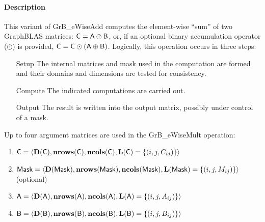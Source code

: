 \paragraph{Description}

This variant of {\sf GrB\_eWiseAdd } computes the element-wise ``sum'' of
two GraphBLAS matrices: ${\sf C} = {\sf A} \oplus {\sf B}$, or, if an optional
binary accumulation operator ($\odot$) is provided, ${\sf C} = {\sf C} \odot
\left({\sf A} \oplus {\sf B}\right)$.  Logically, this operation occurs in
three steps:
\begin{enumerate}[leftmargin=0.75in]
\item[Setup] The internal matrices and mask used in the computation are formed 
and their domains and dimensions are tested for consistency.
\item[Compute] The indicated computations are carried out.
\item[Output] The result is written into the output matrix, possibly under 
control of a mask.
\end{enumerate}

Up to four argument matrices are used in the {\sf GrB\_eWiseMult} operation:
\begin{enumerate}
	\item ${\sf C} = \langle \bold{D}({\sf C}),\bold{nrows}({\sf C}),\bold{ncols}({\sf C}),\bold{L}({\sf C}) = \{(i,j,C_{ij}) \} \rangle$
	\item ${\sf Mask} = \langle \bold{D}({\sf Mask}),\bold{nrows}({\sf Mask}),\bold{ncols}({\sf Mask}),\bold{L}({\sf Mask}) = \{(i,j,M_{ij}) \} \rangle$ (optional)
	\item ${\sf A} = \langle \bold{D}({\sf A}),\bold{nrows}({\sf A}), \bold{ncols}({\sf A}),\bold{L}({\sf A}) = \{(i,j,A_{ij}) \} \rangle$
	\item ${\sf B} = \langle \bold{D}({\sf B}),\bold{nrows}({\sf B}), \bold{ncols}({\sf B}),\bold{L}({\sf B}) = \{(i,j,B_{ij}) \} \rangle$
\end{enumerate}

